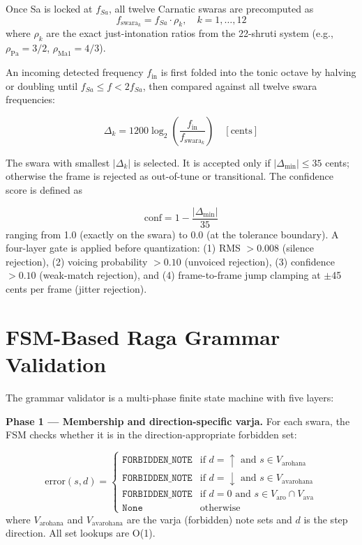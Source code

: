 \documentclass[12pt,a4paper]{report}
\numberwithin{equation}{chapter}
\begin{document}
Once Sa is locked at $f_{Sa}$, all twelve Carnatic swaras are precomputed as
\begin{equation}
f_{\text{swara}_k} = f_{Sa} \cdot \rho_k, \quad k = 1, \ldots, 12
\label{eq:swara-freq}
\end{equation}
where $\rho_k$ are the exact just-intonation ratios from the 22-shruti system (e.g., $\rho_{\text{Pa}} = 3/2$, $\rho_{\text{Ma1}} = 4/3$).

An incoming detected frequency $f_{\text{in}}$ is first folded into the tonic octave by halving or doubling until $f_{Sa} \leq f < 2 f_{Sa}$, then compared against all twelve swara frequencies:

\begin{equation}
\Delta_k = 1200 \log_2 \left( \frac{f_{\text{in}}}{f_{\text{swara}_k}} \right) \quad [\text{cents}]
\label{eq:cents}
\end{equation}

The swara with smallest $|\Delta_k|$ is selected. It is accepted only if $|\Delta_{\min}| \leq 35$ cents; otherwise the frame is rejected as out-of-tune or transitional. The confidence score is defined as

\begin{equation}
\text{conf} = 1 - \frac{|\Delta_{\min}|}{35}
\label{eq:conf}
\end{equation}
ranging from 1.0 (exactly on the swara) to 0.0 (at the tolerance boundary). A four-layer gate is applied before quantization: (1) RMS $> 0.008$ (silence rejection), (2) voicing probability $> 0.10$ (unvoiced rejection), (3) confidence $> 0.10$ (weak-match rejection), and (4) frame-to-frame jump clamping at $\pm$45 cents per frame (jitter rejection).

\section{FSM-Based Raga Grammar Validation}

The grammar validator is a multi-phase finite state machine with five layers:

\textbf{Phase 1 --- Membership and direction-specific varja.} For each swara, the FSM checks whether it is in the direction-appropriate forbidden set:

\begin{equation}
\text{error}(s, d) = \begin{cases}
\texttt{FORBIDDEN\_NOTE} & \text{if } d = \uparrow \text{ and } s \in V_{\text{arohana}} \\
\texttt{FORBIDDEN\_NOTE} & \text{if } d = \downarrow \text{ and } s \in V_{\text{avarohana}} \\
\texttt{FORBIDDEN\_NOTE} & \text{if } d = 0 \text{ and } s \in V_{\text{aro}} \cap V_{\text{ava}} \\
\texttt{None} & \text{otherwise}
\end{cases}
\label{eq:fsm}
\end{equation}
where $V_{\text{arohana}}$ and $V_{\text{avarohana}}$ are the varja (forbidden) note sets and $d$ is the step direction. All set lookups are O(1).
\end{document}
